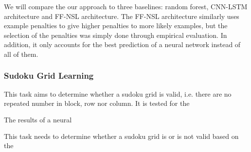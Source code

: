 We will compare the our approach to three baselines: random forest, CNN-LSTM architecture and FF-NSL architecture.
The FF-NSL architecture similarly uses example penalties to give higher penalties to more likely examples, but the selection of the penalties was simply done through empirical evaluation.
In addition, it only accounts for the best prediction of a neural network instead of all of them.

\subsubsection{Sudoku Grid Learning}

This task aims to determine whether a sudoku grid is valid, i.e. there are no repeated number in block, row nor column.
It is tested for the 

The results of a neural 


This task needs to determine whether a sudoku grid is or is not valid based on the 

